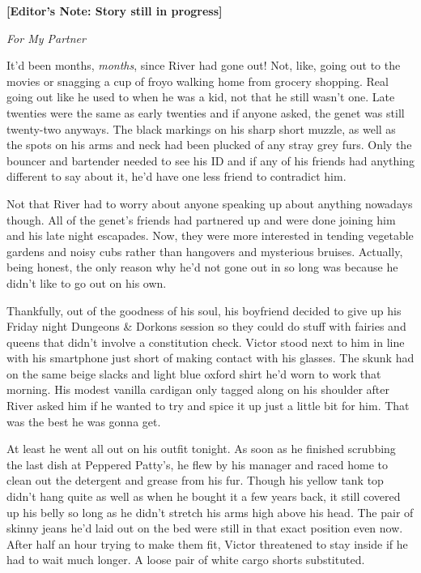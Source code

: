 \textbf{{[}Editor's Note: Story still in progress{]}}

\emph{For My Partner}

It'd been months, \emph{months}, since River had gone out! Not, like,
going out to the movies or snagging a cup of froyo walking home from
grocery shopping. Real going out like he used to when he was a kid, not
that he still wasn't one. Late twenties were the same as early twenties
and if anyone asked, the genet was still twenty-two anyways. The black
markings on his sharp short muzzle, as well as the spots on his arms and
neck had been plucked of any stray grey furs. Only the bouncer and
bartender needed to see his ID and if any of his friends had anything
different to say about it, he'd have one less friend to contradict him.

Not that River had to worry about anyone speaking up about anything
nowadays though. All of the genet's friends had partnered up and were
done joining him and his late night escapades. Now, they were more
interested in tending vegetable gardens and noisy cubs rather than
hangovers and mysterious bruises. Actually, being honest, the only
reason why he'd not gone out in so long was because he didn't like to go
out on his own.

Thankfully, out of the goodness of his soul, his boyfriend decided to
give up his Friday night Dungeons \& Dorkons session so they could do
stuff with fairies and queens that didn't involve a constitution check.
Victor stood next to him in line with his smartphone just short of
making contact with his glasses. The skunk had on the same beige slacks
and light blue oxford shirt he'd worn to work that morning. His modest
vanilla cardigan only tagged along on his shoulder after River asked him
if he wanted to try and spice it up just a little bit for him. That was
the best he was gonna get.

At least he went all out on his outfit tonight. As soon as he finished
scrubbing the last dish at Peppered Patty's, he flew by his manager and
raced home to clean out the detergent and grease from his fur. Though
his yellow tank top didn't hang quite as well as when he bought it a few
years back, it still covered up his belly so long as he didn't stretch
his arms high above his head. The pair of skinny jeans he'd laid out on
the bed were still in that exact position even now. After half an hour
trying to make them fit, Victor threatened to stay inside if he had to
wait much longer. A loose pair of white cargo shorts substituted.

